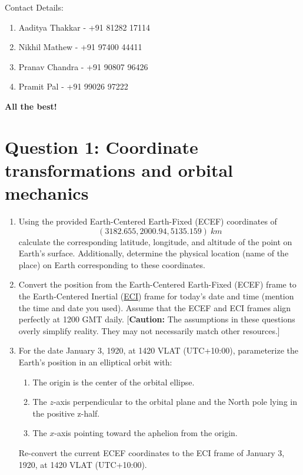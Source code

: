 \documentclass[a4paper, 12pt]{exam}
\begin{document}
Contact Details:
		\begin{enumerate}
			\item Aaditya Thakkar - +91 81282 17114
			\item Nikhil Mathew - +91 97400 44411
			\item Pranav Chandra - +91 90807 96426
			\item Pramit Pal - +91 99026 97222
		\end{enumerate}

	\begin{center}
		\textbf{All the best!}
	\end{center}
		
	\pagebreak
	
	

\section*{Question 1: Coordinate transformations and orbital mechanics}

\begin{enumerate}[label = (\alph*)]
	\item Using the provided Earth-Centered Earth-Fixed (ECEF) coordinates of \[(3182.655, 2000.94, 5135.159) \ km\] calculate the corresponding latitude, longitude, and altitude of the point on Earth's surface. Additionally, determine the physical location (name of the place) on Earth corresponding to these coordinates.
	\item Convert the position from the Earth-Centered Earth-Fixed (ECEF) frame to the Earth-Centered Inertial (\href{https://www.researchgate.net/profile/Angus-Andrews/publication/258438421/figure/fig2/AS:887548809322496@1588619534218/Fig-C1-Direction-of-vernal-equinox.png}{ECI}) frame for today's date and time (mention the time and date you used). Assume that the ECEF and ECI frames align perfectly at 1200 GMT daily. [\textbf{Caution:} The assumptions in these questions overly simplify reality. They may not necessarily match other resources.]
	\item For the date January 3, 1920, at 1420 VLAT (UTC+10:00), parameterize the Earth's position in an elliptical orbit with:
	\begin{enumerate}[label = (\roman*)]
		\item The origin is the center of the orbital ellipse.
		\item The \( z \)-axis perpendicular to the orbital plane and the North pole lying in the positive z-half.
		\item The \( x \)-axis pointing toward the aphelion from the origin.
	\end{enumerate}
	Re-convert the current ECEF coordinates to the ECI frame of January 3, 1920, at 1420 VLAT (UTC+10:00).
\end{enumerate}
\end{document}
